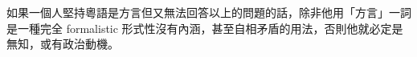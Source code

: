 \documentclass[a5paper, 10pt, openany]{book} %
\begin{document}
如果一個人堅持粵語是方言但又無法回答以上的問題的話，除非他用「方言」一詞是一種完全 formalistic 形式性沒有內涵，甚至自相矛盾的用法，否則他就必定是無知，或有政治動機。
































\end{document}
